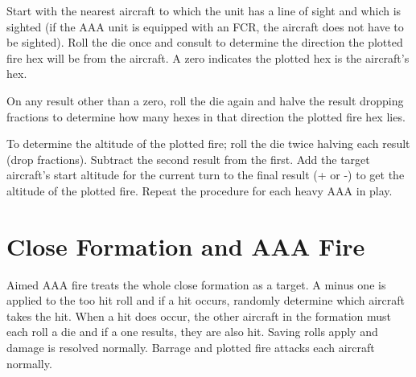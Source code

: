 \begin{advancedrules}
Start with the nearest aircraft to which the unit has a line of sight and which is sighted (if the AAA unit is equipped with an FCR, the aircraft does not have to be sighted). Roll the die once and consult  to determine the direction the plotted fire hex will be from the aircraft. A zero indicates the plotted hex is the aircraft's hex.

On any result other than a zero, roll the die again and halve the result dropping fractions to determine how many hexes in that direction the plotted fire hex lies.

To determine the altitude of the plotted fire; roll the die twice halving each result (drop fractions). Subtract the second result from the first. Add the target aircraft's start altitude for the current turn to the final result (+ or -) to get the altitude of the plotted fire. Repeat the procedure for each heavy AAA in play.

\section{Close Formation and AAA Fire}

Aimed AAA fire treats the whole close formation as a target. A minus one is applied to the too hit roll and if a hit occurs, randomly determine which aircraft takes the hit. When a hit does occur, the other aircraft in the formation must each roll a die and if a one results, they are also hit. Saving rolls apply and damage is resolved normally. Barrage and plotted fire attacks each aircraft normally.

\end{advancedrules}

